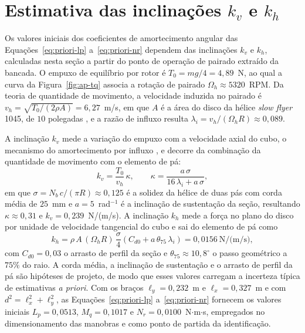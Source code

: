 {\color{blue}
\section[{\color{blue}Estimativa das inclinações $k_v$ e $k_h$}]{{\color{blue}Estimativa das inclinações $k_v$ e $k_h$}}
\label{ap:kv-kh}

Os valores iniciais dos coeficientes de amortecimento angular das Equações~\eqref{eq:priori-lp} a~\eqref{eq:priori-nr} dependem das inclinações $k_v$ e $k_h$, calculadas nesta seção a partir do ponto de operação de pairado extraído da bancada. O empuxo de equilíbrio por rotor é $T_0 = mg/4 = 4{,}89$~N, ao qual a curva da Figura~\ref{fig:ap-tq} associa a rotação de pairado $\Omega_h \approx 5320$~RPM. Da teoria de quantidade de movimento, a velocidade induzida no pairado é $v_h = \sqrt{T_0/(2\rho A)} = 6{,}27$~m/s, em que $A$ é a área do disco da hélice \textit{slow flyer} 1045, de $10$ polegadas \cite{DeLucena2025}, e a razão de influxo resulta $\lambda_i = v_h/(\Omega_h R) \approx 0{,}089$.

A inclinação $k_v$ mede a variação do empuxo com a velocidade axial do cubo, o mecanismo do amortecimento por influxo \cite{Nguyen2025}, e decorre da combinação da quantidade de movimento com o elemento de pá:
\begin{equation}
  k_v = \frac{T_0}{v_h}\,\kappa, \qquad \kappa = \frac{a\,\sigma}{16\,\lambda_i + a\,\sigma},
  \label{eq:ap-kv}
\end{equation}
em que $\sigma = N_b\,c/(\pi R) \approx 0{,}125$ é a solidez da hélice de duas pás com corda média de $25$~mm e $a = 5$~rad$^{-1}$ é a inclinação de sustentação da seção, resultando $\kappa \approx 0{,}31$ e $k_v = 0{,}239$~N/(m/s). A inclinação $k_h$ mede a força no plano do disco por unidade de velocidade tangencial do cubo e sai do elemento de pá como
\begin{equation}
  k_h = \rho\,A\,(\Omega_h R)\,\frac{\sigma}{4}\left(C_{d0} + a\,\theta_{75}\,\lambda_i\right) = 0{,}0156~\text{N/(m/s)},
  \label{eq:ap-kh}
\end{equation}
com $C_{d0} = 0{,}03$ o arrasto de perfil da seção e $\theta_{75} \approx 10{,}8^{\circ}$ o passo geométrico a $75\%$ do raio. A corda média, a inclinação de sustentação e o arrasto de perfil da pá são hipóteses de projeto, de modo que esses valores carregam a incerteza típica de estimativas \textit{a priori}. Com os braços $\ell_y = 0{,}232$~m e $\ell_x = 0{,}327$~m e com $d^2 = \ell_x^2 + \ell_y^2$, as Equações~\eqref{eq:priori-lp} a~\eqref{eq:priori-nr} fornecem os valores iniciais $L_p = 0{,}0513$, $M_q = 0{,}1017$ e $N_r = 0{,}0100$~N$\cdot$m$\cdot$s, empregados no dimensionamento das manobras e como ponto de partida da identificação.
}

